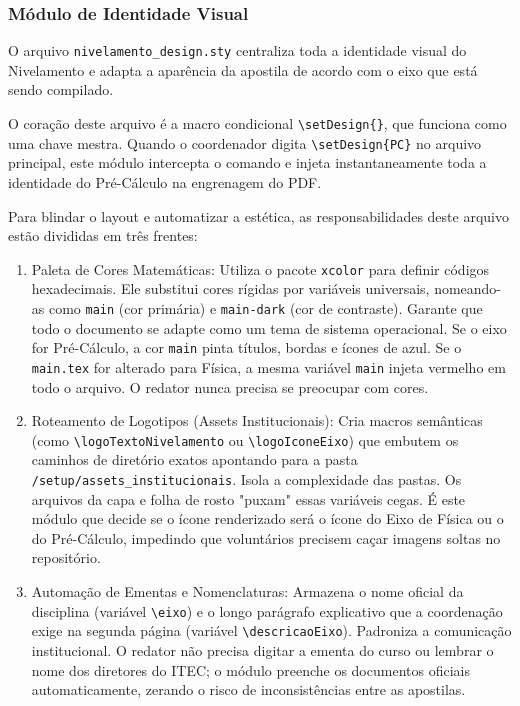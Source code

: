 \subsubsection{Módulo de Identidade Visual}

O arquivo \texttt{nivelamento\_design.sty} centraliza toda a identidade visual do Nivelamento e adapta a aparência da apostila de acordo com o eixo que está sendo compilado.

O coração deste arquivo é a macro condicional \verb|\setDesign{}|, que funciona como uma chave mestra. Quando o coordenador digita \verb|\setDesign{PC}| no arquivo principal, este módulo intercepta o comando e injeta instantaneamente toda a identidade do Pré-Cálculo na engrenagem do PDF.

Para blindar o layout e automatizar a estética, as responsabilidades deste arquivo estão divididas em três frentes:

\begin{enumerate}
    \item Paleta de Cores Matemáticas: Utiliza o pacote \texttt{xcolor} para definir códigos hexadecimais. Ele substitui cores rígidas por variáveis universais, nomeando-as como \texttt{main} (cor primária) e \texttt{main-dark} (cor de contraste). Garante que todo o documento se adapte como um tema de sistema operacional. Se o eixo for Pré-Cálculo, a cor \texttt{main} pinta títulos, bordas e ícones de azul. Se o \texttt{main.tex} for alterado para Física, a mesma variável \texttt{main} injeta vermelho em todo o arquivo. O redator nunca precisa se preocupar com cores.

    \item Roteamento de Logotipos (Assets Institucionais): Cria macros semânticas (como \verb|\logoTextoNivelamento| ou \verb|\logoIconeEixo|) que embutem os caminhos de diretório exatos apontando para a pasta \verb|/setup/assets_institucionais|. Isola a complexidade das pastas. Os arquivos da capa e folha de rosto "puxam" essas variáveis cegas. É este módulo que decide se o ícone renderizado será o ícone do Eixo de Física ou o do Pré-Cálculo, impedindo que voluntários precisem caçar imagens soltas no repositório.

    \item Automação de Ementas e Nomenclaturas: Armazena o nome oficial da disciplina (variável \verb|\eixo|) e o longo parágrafo explicativo que a coordenação exige na segunda página (variável \verb|\descricaoEixo|). Padroniza a comunicação institucional. O redator não precisa digitar a ementa do curso ou lembrar o nome dos diretores do ITEC; o módulo preenche os documentos oficiais automaticamente, zerando o risco de inconsistências entre as apostilas.
\end{enumerate}

